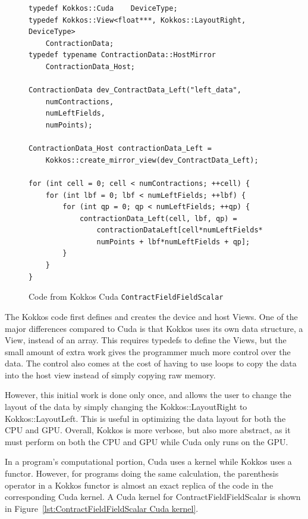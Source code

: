 \begin{figure}[!htb]
	\begin{lstlisting}
typedef Kokkos::Cuda	DeviceType;
typedef Kokkos::View<float***, Kokkos::LayoutRight, DeviceType>
	ContractionData;
typedef typename ContractionData::HostMirror
	ContractionData_Host;

ContractionData dev_ContractData_Left("left_data",
	numContractions,
	numLeftFields,
	numPoints);

ContractionData_Host contractionData_Left = 
	Kokkos::create_mirror_view(dev_ContractData_Left);

for (int cell = 0; cell < numContractions; ++cell) {
	for (int lbf = 0; lbf < numLeftFields; ++lbf) {
		for (int qp = 0; qp < numLeftFields; ++qp) {
			contractionData_Left(cell, lbf, qp) = 
				contractionDataLeft[cell*numLeftFields*
				numPoints + lbf*numLeftFields + qp];
		}
	}
}
	\end{lstlisting}
\caption{Code from Kokkos Cuda \texttt{ContractFieldFieldScalar}
\label{lst:ContractFieldFieldScalar Kokkos Cuda Data Setup}}
\end{figure}

The Kokkos code first defines and creates the device and host Views. One of the
major differences compared to Cuda is that Kokkos uses its own data structure, a
View, instead of an array. This requires typedefs to define the
Views, but the small amount of extra work gives the
programmer much more control over the data. The control also comes at the cost
of having to use loops to copy the data into the host view instead of simply
copying raw memory.

However, this initial work is done only once, and allows the user to change the
layout of the data by simply changing the Kokkos::LayoutRight to
Kokkos::LayoutLeft.  This is useful in optimizing the data layout for both the
CPU and GPU. Overall, Kokkos is more verbose, but also more abstract, as it must
perform on both the CPU and GPU while Cuda only runs on the GPU. 

In a program's computational portion, Cuda uses a kernel while Kokkos uses a
functor.  However, for programs doing the same calculation, the parenthesis
operator in a Kokkos functor is almost an exact replica of the code in
the corresponding Cuda kernel. A Cuda kernel for ContractFieldFieldScalar is
shown in Figure~\ref{lst:ContractFieldFieldScalar Cuda kernel}.

